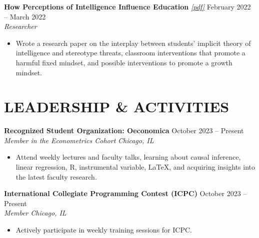 \documentclass[letterpaper, 9pt]{extarticle}
\begin{document}
\noindent
\textbf{How Perceptions of Intelligence Influence Education} 
\emph{\href{https://drive.google.com/file/d/1lgQKk7_geC_NsAG5uHnPfWY3wKy38_-o/view?usp=sharing}{\color{blue} [pdf]}} 
\hfill February 2022 -- March 2022 \\
\textit{Researcher} 
\begin{itemize}
    \item Wrote a research paper on the interplay between students' implicit theory of intelligence and stereotype threats, classroom interventions that promote a harmful fixed mindset, and possible interventions to promote a growth mindset. 
\end{itemize}



\section*{LEADERSHIP \& ACTIVITIES}


\noindent
\textbf{Recognized Student Organization: Oeconomica} 
\hfill October 2023 -- Present \\
\textit{Member in the Econometrics Cohort} \hfill \textit{Chicago, IL}
\begin{itemize}
    \item Attend weekly lectures and faculty talks, learning about causal inference, linear regression, R, instrumental variable, \LaTeX, and acquiring insights into the latest faculty research.
\end{itemize}

\noindent
\textbf{International Collegiate Programming Contest (ICPC)} 
\hfill October 2023 -- Present \\
\textit{Member} \hfill \textit{Chicago, IL}
\begin{itemize}
    \item Actively participate in weekly training sessions for ICPC.
\end{itemize}
\end{document}
